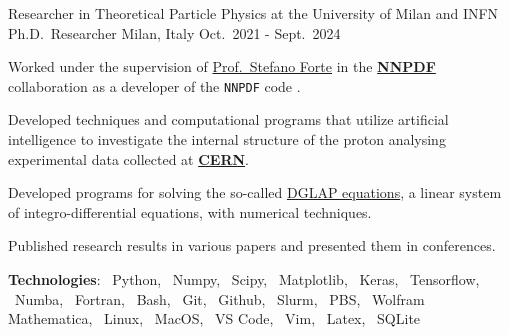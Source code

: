 \begin{cventries}
    \cventry
    {Researcher in Theoretical Particle Physics at the University of Milan and INFN}
    {Ph.D.\ Researcher}
    {Milan, Italy}
    {Oct.\ 2021 - Sept.\ 2024}
    {
        \begin{cvitems} %
            \item Worked under the supervision of \href{https://inspirehep.net/authors/1009661?ui-citation-summary=true}{Prof.\ Stefano Forte} in the \href{https://nnpdf.mi.infn.it}{\textbf{NNPDF}} collaboration 
            as a developer of the \texttt{NNPDF} code \href{https://github.com/NNPDF}{\githublogo}.
            \item Developed techniques and computational programs that utilize artificial intelligence to 
            investigate the internal structure of the proton analysing experimental data collected at \href{https://home.cern}{\textbf{CERN}}.
            \item Developed programs for solving the so-called \href{https://eko.readthedocs.io/en/latest/theory/DGLAP.html}{DGLAP equations}, a linear system of integro-differential equations, with numerical techniques.
            \item Published research results in various papers and presented them in conferences.
            \item[] \textbf{\textcolor{awesome-red}{Tec}hnologies}: \pythonlogo{}~Python, \numpylogo{}~Numpy, \scipylogo{}~Scipy, \matplotliblogo{}~Matplotlib{}, \keraslogo{}~Keras, \tensorflowlogo{}~Tensorflow, \numbalogo{}~Numba, \fortranlogo{}~Fortran, \bashlogo{}~Bash, \gitlogo{}~Git, \githublogo{}~Github, \slurmlogo{}~Slurm, \pbslogo{}~PBS, \mathematicalogo{}~Wolfram Mathematica, \linuxlogo{}~Linux, \faApple{}~MacOS, \vscodelogo{}~VS Code, \vimlogo{}~Vim, \latexlogo{}~Latex, \sqlitelogo{}~SQLite
        \end{cvitems}
    }



\end{cventries}

